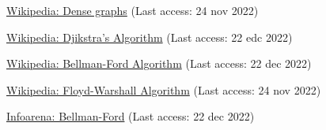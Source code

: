 \documentclass[runningheads]{llncs}
\begin{document}
%
%
%

% 
%
\begin{thebibliography}{8}
\href{https://en.wikipedia.org/wiki/Dense_graph}{Wikipedia: Dense graphs} (Last access: 24 nov 2022)

\href{https://en.wikipedia.org/wiki/Dijkstra\%27s_algorithm}{Wikipedia: Djikstra's Algorithm} (Last access: 22 edc 2022)

\href{https://en.wikipedia.org/wiki/Bellman\%E2\%80\%93Ford_algorithm}{Wikipedia: Bellman-Ford Algorithm} (Last access: 22 dec 2022)

\href{https://en.wikipedia.org/wiki/Floyd\%E2\%80\%93Warshall_algorithm}{Wikipedia: Floyd-Warshall Algorithm} (Last access: 24 nov 2022)

\href{https://www.infoarena.ro/problema/bellmanford}{Infoarena: Bellman-Ford} (Last access: 22 dec 2022)
\end{thebibliography}
\end{document}
